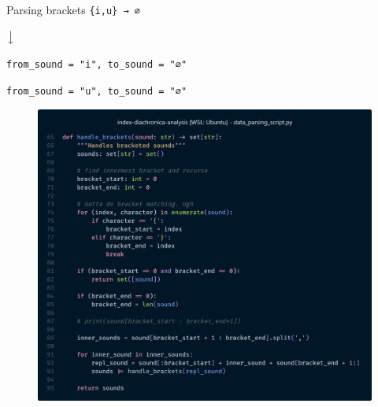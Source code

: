 \documentclass[10pt]{beamer}
\begin{document}
  \begin{frame}[fragile=singleslide]{Parsing brackets}
    \centering
    \verb|{i,u} → ∅|
    
    \vspace*{5pt}

    $\big\downarrow$

    \vspace*{5pt}

    \verb|from_sound = "i", to_sound = "∅"|
    
    \verb|from_sound = "u", to_sound = "∅"|

    \vspace*{5pt}

    \begin{figure}
      \centering
      \includegraphics[width=1\textwidth, height=0.5\textheight, keepaspectratio]{brackets.png}
    \end{figure}
  \end{frame}
\end{document}
